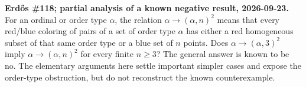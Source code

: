 \textbf{Erd\H{o}s \#118; partial analysis of a known negative result, 2026-09-23.}
For an ordinal or order type $\alpha$, the relation $\alpha\to(\alpha,n)^2$ means that every red/blue coloring of pairs of a set of order type $\alpha$ has either a red homogeneous subset of that same order type or a blue set of $n$ points. Does $\alpha\to(\alpha,3)^2$ imply $\alpha\to(\alpha,n)^2$ for every finite $n\geq3$? The general answer is known to be no. The elementary arguments here settle important simpler cases and expose the order-type obstruction, but do not reconstruct the known counterexample.
